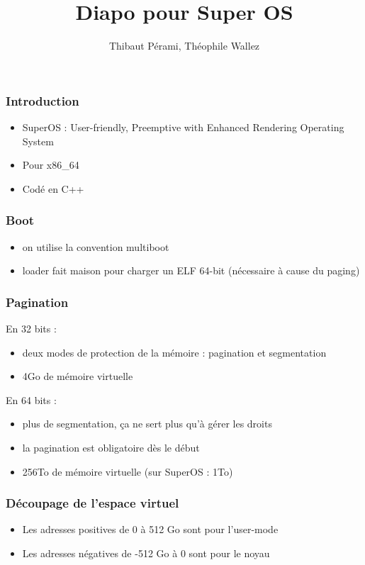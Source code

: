 \documentclass[aspectration=43]{beamer}
\title{Diapo pour Super OS}
\author{Thibaut Pérami, Théophile Wallez}
\begin{document}
\frame{\titlepage}

\begin{frame}
    \frametitle{Introduction}
    \begin{itemize}
        \item SuperOS : User-friendly, Preemptive with Enhanced Rendering Operating System
        \item Pour x86\_64
        \item Codé en C++
    \end{itemize}
\end{frame}

\begin{frame}
    \frametitle{Boot}
    \begin{itemize}
        \item on utilise la convention multiboot
        \item loader fait maison pour charger un ELF 64-bit (nécessaire à cause du paging)
    \end{itemize}
\end{frame}

\begin{frame}
    \frametitle{Pagination}
    En 32 bits :
    \begin{itemize}
        \item deux modes de protection de la mémoire : pagination et segmentation
        \item 4Go de mémoire virtuelle
    \end{itemize}
    En 64 bits :
    \begin{itemize}
        \item plus de segmentation, ça ne sert plus qu'à gérer les droits
        \item la pagination est obligatoire dès le début
        \item 256To de mémoire virtuelle (sur SuperOS : 1To)
    \end{itemize}
\end{frame}

\begin{frame}
    \frametitle{Découpage de l'espace virtuel}
    \begin{itemize}
        \item Les adresses positives de 0 à 512 Go sont pour l'user-mode
        \item Les adresses négatives de -512 Go à 0 sont pour le noyau
    \end{itemize}
\end{frame}
\end{document}
